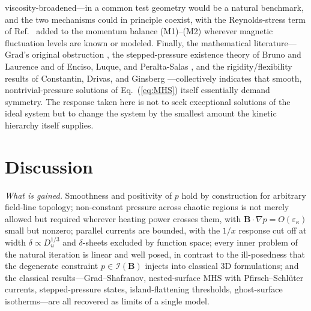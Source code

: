 \documentclass[english]{article}
\newcommand{\bB}{\mathbf{B}}
\begin{document}
viscosity-broadened---in a common test geometry would be a natural benchmark, and the two
mechanisms could in principle coexist, with the Reynolds-stress term of Ref.~\cite{ruth2026} added
to the momentum balance (M1)--(M2) wherever magnetic fluctuation levels are known or modeled.
Finally,
the mathematical literature---Grad's original obstruction \cite{grad1967}, the stepped-pressure
existence theory of Bruno and Laurence \cite{bruno1996} and of Enciso, Luque, and Peralta-Salas
\cite{enciso2025}, and the rigidity/flexibility results of Constantin, Drivas, and Ginsberg
\cite{constantin2021}---collectively indicates that smooth, nontrivial-pressure solutions of
Eq.~(\ref{eq:MHS}) itself essentially demand symmetry. The response taken here is not to seek
exceptional solutions of the ideal system but to change the system by the smallest amount the
kinetic hierarchy itself supplies.

\section{Discussion}
\label{sec:discussion}

\emph{What is gained.} Smoothness and positivity of $p$ hold by construction for arbitrary
field-line topology; non-constant pressure across chaotic regions is not merely allowed but
required wherever heating power crosses them, with $\bB\cdot\nabla p=O(\varepsilon_\kappa)$ small
but nonzero; parallel currents are bounded, with the $1/x$ response cut off at width
$\delta\propto D_u^{1/3}$ and $\delta$-sheets excluded by function space; every inner problem of
the natural iteration is linear and well posed, in contrast to the ill-posedness that the
degenerate constraint $p\in\mathcal{I}(\bB)$ injects into classical 3D formulations; and the
classical results---Grad--Shafranov, nested-surface MHS with Pfirsch--Schl\"uter currents,
stepped-pressure states, island-flattening thresholds, ghost-surface isotherms---are all recovered
as limits of a single model.
\end{document}
